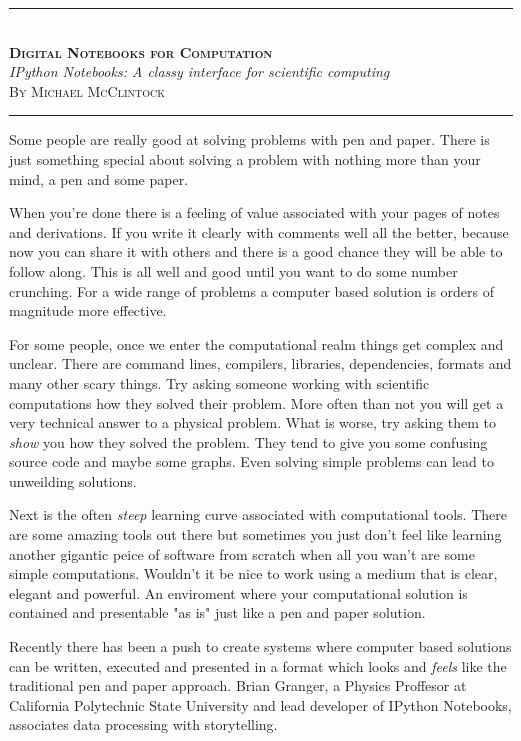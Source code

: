 \documentclass[11pt, a4paper]{article}  %
\begin{document}
\begin{center}
    \rule[0.5ex]{1\columnwidth}{1pt}
    \\[4mm]
    \textbf{\textsc{\Huge Digital Notebooks for Computation}}
    \\[6mm]
    \textit{\Large IPython Notebooks: A classy interface for scientific
    computing}
    \\[6mm]
    \textsc{\large By Michael McClintock}
    \\[4mm]
    \rule[0.5ex]{1\columnwidth}{1pt}
\end{center}

\begin{multicols}{2}

Some people are really good at solving problems with pen and paper. There is
just something special about solving a problem with nothing more than your
mind, a pen and some paper.

When you're done there is a feeling of value associated with your pages of
notes and derivations. If you write it clearly with comments well all the
better, because now you can share it with others and there is a good chance
they will be able to follow along. This is all well and good until you want to
do some number crunching. For a wide range of problems a computer based
solution is orders of magnitude more effective.

For some people, once we enter the computational realm things get complex and
unclear. There are command lines, compilers, libraries, dependencies, formats
and many other scary things. Try asking someone working with scientific
computations how they solved their problem. More often than not you will get a
very technical answer to a physical problem. What is worse, try asking them to
\emph{show} you how they solved the problem. They tend to give you some
confusing source code and maybe some graphs. Even solving simple problems can
lead to unweilding solutions.

Next is the often \emph{steep} learning curve associated with computational
tools. There are some amazing tools out there but sometimes you just don't
feel like learning another gigantic peice of software from scratch when all
you wan't are some simple computations. Wouldn't it be nice to work using a
medium that is clear, elegant and powerful. An enviroment where your
computational solution is contained and presentable "as is" just like a pen
and paper solution.

Recently there has been a push to create systems where computer based
solutions can be written, executed and presented in a format which looks and
\emph{feels} like the traditional pen and paper approach. Brian Granger, a
Physics Proffesor at California Polytechnic State University and lead
developer of IPython Notebooks, associates data processing with storytelling.
\cite{granger}


\end{multicols}
\end{document}

